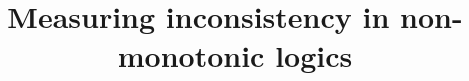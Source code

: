 \documentclass[english,m,seminar,palatino]{AIGpaper}
\author{\myAuthor}
\title{Measuring inconsistency in non-monotonic logics}
\begin{document}
\maketitle %





\makestatement
\end{document}
